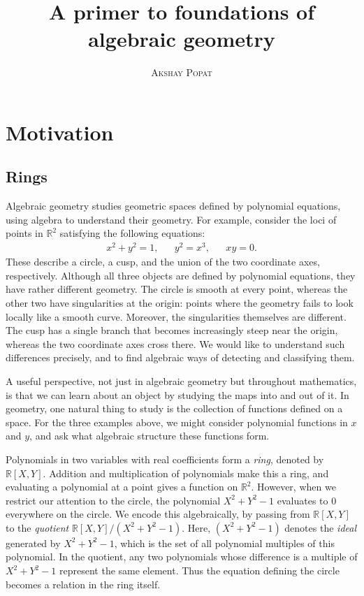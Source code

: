 \documentclass[a4paper,11pt]{article}
\title{\Huge \textbf{A primer to foundations of algebraic geometry} }
\author{
    \textsc{Akshay Popat}
}
\begin{document}
    \maketitle
    
    \tableofcontents

    \section{Motivation}
    \subsection{Rings}
    Algebraic geometry studies geometric spaces defined by polynomial equations, using algebra to understand their geometry. For example, consider the loci of points in $\mathbb{R}^2$ satisfying the following equations:
    \begin{align*}
      x^2 + y^2 = 1, && y^2 = x^3, && xy = 0.
    \end{align*}
    These describe a circle, a cusp, and the union of the two coordinate axes, respectively. Although all three objects are defined by polynomial equations, they have rather different geometry. The circle is smooth at every point, whereas the other two have singularities at the origin: points where the geometry fails to look locally like a smooth curve. Moreover, the singularities themselves are different. The cusp has a single branch that becomes increasingly steep near the origin, whereas the two coordinate axes cross there. We would like to understand such differences precisely, and to find algebraic ways of detecting and classifying them.

    A useful perspective, not just in algebraic geometry but throughout mathematics, is that we can learn about an object by studying the maps into and out of it. In geometry, one natural thing to study is the collection of functions defined on a space. For the three examples above, we might consider polynomial functions in $x$ and $y$, and ask what algebraic structure these functions form.

    Polynomials in two variables with real coefficients form a \textit{ring}, denoted by $\mathbb{R}[X,Y]$. Addition and multiplication of polynomials make this a ring, and evaluating a polynomial at a point gives a function on $\mathbb{R}^2$. However, when we restrict our attention to the circle, the polynomial $X^2 + Y^2 - 1$ evaluates to \(0\) everywhere on the circle. We encode this algebraically, by passing from $\mathbb{R}[X,Y]$ to the \textit{quotient} \(\mathbb{R}[X,Y]/(X^2 + Y^2 - 1)\). Here, $(X^2 + Y^2 - 1)$ denotes the \textit{ideal} generated by $X^2 + Y^2 - 1$, which is the set of all polynomial multiples of this polynomial. In the quotient, any two polynomials whose difference is a multiple of $X^2 + Y^2 - 1$ represent the same element. Thus the equation defining the circle becomes a relation in the ring itself.
\end{document}
